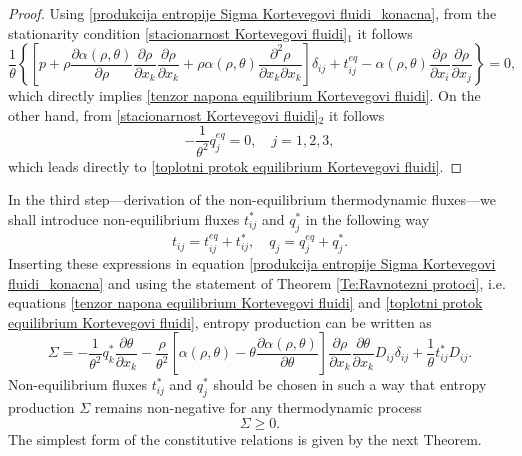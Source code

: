 \documentclass[a4paper,fleqn]{cas-sc}
\theoremstyle{definition}
\begin{document}
\begin{proof}
	Using \eqref{produkcija entropije Sigma Kortevegovi fluidi_konacna}, from the stationarity condition \eqref{stacionarnost Kortevegovi fluidi}$_{1}$ it follows 
	\begin{equation*}
		\dfrac{1}{\theta} \left\{ 
			\left[ p + \rho \dfrac{\partial \alpha(\rho, \theta)}{\partial \rho} 
			\dfrac{\partial \rho}{\partial x_k} \dfrac{\partial \rho}{\partial x_k} 
			+ \rho \alpha(\rho, \theta) \dfrac{\partial^{2} \rho}{\partial x_k \partial x_k} \right]
			\delta_{ij} 
			+ t_{ij}^{eq} 
			- \alpha(\rho, \theta) \dfrac{\partial \rho}{\partial x_i} \dfrac{\partial \rho}{\partial x_j} 
			\right\} = 0,
	\end{equation*} 
	which directly implies \eqref{tenzor napona equilibrium Kortevegovi fluidi}. On the other hand, from \eqref{stacionarnost Kortevegovi fluidi}$_{2}$ it follows 
	\begin{equation*}
		- \dfrac{1}{\theta^{2}} q_{j}^{eq} = 0, \quad j = 1,2,3, 
	\end{equation*}
	which leads directly to \eqref{toplotni protok equilibrium Kortevegovi fluidi}. 
\end{proof} 

In the third step---derivation of the non-equilibrium thermodynamic fluxes---we shall introduce non-equilibrium fluxes $t_{ij}^{\ast}$ and $q_{j}^{\ast}$ in the following way
\begin{equation*}
	t_{ij} = t_{ij}^{eq} + t_{ij}^{\ast}, \quad 
	q_{j} = q_{j}^{eq} + q_{j}^{\ast}. 
\end{equation*}
Inserting these expressions in equation \eqref{produkcija entropije Sigma Kortevegovi fluidi_konacna} and using the statement of Theorem \ref{Te:Ravnotezni protoci}, i.e. equations \eqref{tenzor napona equilibrium Kortevegovi fluidi} and \eqref{toplotni protok equilibrium Kortevegovi fluidi}, entropy production can be written as 
\begin{equation} \label{Produkcija entropije neravnotezna Kortevegovi fluidi}
	\Sigma = - \dfrac{1}{\theta^{2}} q_{k}^{\ast} \dfrac{\partial \theta}{\partial x_k} 
	- \dfrac{\rho}{\theta^{2}} \left[ \alpha(\rho, \theta) 
	- \theta \dfrac{\partial \alpha(\rho, \theta)}{\partial \theta} \right] 
	\dfrac{\partial \rho}{\partial x_k} \dfrac{\partial \theta}{\partial x_k} D_{ij} \delta_{ij}
	+ \dfrac{1}{\theta} t_{ij}^{\ast} D_{ij}. 
\end{equation} 
Non-equilibrium fluxes $t_{ij}^{\ast}$ and $q_{j}^{\ast}$ should be chosen in such a way that entropy production $\Sigma$ remains non-negative for any thermodynamic process 
\begin{equation} \label{Entropijska nejednakost Kortevegovi fluidi}
	\Sigma \geq 0. 
\end{equation} 
The simplest form of the constitutive relations is given by the next Theorem. 
\end{document}
